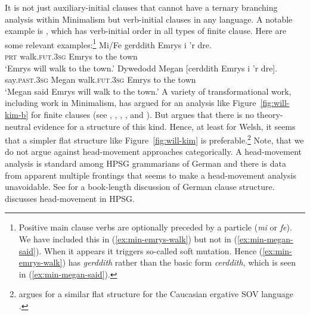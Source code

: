 \documentclass[output=paper]{langsci/langscibook}
\begin{document}
It is not just  auxiliary-initial clauses that cannot have a ternary branching analysis within Minimalism but verb-initial clauses in any language. A notable example is , which has verb-initial order in all types of finite clause. Here are some relevant examples:\footnote{%
	Positive main clause verbs are optionally preceded by a particle (\textit{mi} or \textit{fe}). We have included this in (\ref{ex:min-emrys-walk}) but not in (\ref{ex:min-megan-said}). When it appears it triggers so-called soft mutation. Hence (\ref{ex:min-emrys-walk}) has \textit{gerddith} rather than the basic form \textit{cerddith}, which is seen in (\ref{ex:min-megan-said}).
}
\eal
\ex\label{ex:min-emrys-walk}
\gll Mi/Fe gerddith Emrys i 'r dre.\\
     \textsc{prt} walk.\textsc{fut}.\textsc{3sg} Emrys to the town\\\welsh
\glt `Emrys will walk to the town.'
\ex\label{ex:min-megan-said}
\gll Dywedodd Megan [cerddith Emrys i 'r dre].\\
     say.\textsc{past}.\textsc{3sg} Megan \spacebr{}walk.\textsc{fut}.\textsc{3sg} Emrys to the town\\
\glt `Megan said Emrys will walk to the town.'
\zl
A variety of transformational work, including work in Minimalism, has argued for an analysis like Figure~\ref{fig:will-kim-b} for  finite clauses (see \eg \citealt{JonesThomas.1977}, \citealt{Sproat.1985}, \citealt{Sadler.1988}, \citealt{Rouveret.1994}, and \citealt{Roberts.2005}). But \citet{Borsley.2006b} argues that there is no theory-neutral evidence for a structure of this kind. Hence, at least for Welsh, it seems that a simpler flat structure like Figure~\ref{fig:will-kim} is preferable.\footnote{%
	\citet{Borsley.2016} argues for a similar flat structure for the Caucasian ergative SOV language .%
} Note, that we do not argue against head-movement approaches categorically. A head-movement
analysis is standard among HPSG grammarians of German and there is data from apparent multiple
frontings that seems to make a head-movement analysis unavoidable. See  for a
book-length discussion of German clause structure.  discusses
head-movement in HPSG.
\end{document}
